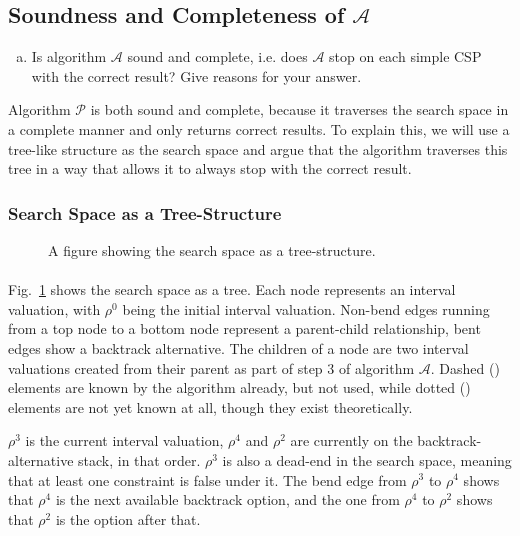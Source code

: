 \subsection{Soundness and Completeness of $\mathcal{A}$}
\begin{enumerate}[(b)]
\item Is algorithm $\mathcal{A}$ sound and complete, i.e. does $\mathcal{A}$ stop on each simple CSP with the correct result? Give reasons for your answer.
\end{enumerate}

Algorithm $\mathcal{P}$ is both sound and complete, because it traverses the search space in a complete manner and only returns correct results.
To explain this, we will use a tree-like structure as the search space and argue that the algorithm traverses this tree in a way that allows it to always stop with the correct result.

\subsubsection{Search Space as a Tree-Structure}

\begin{figure}[H]
    \centering
    
    \caption{
        A figure showing the search space as a tree-structure.
    }
    \label{fig:search-tree}
\end{figure}


\paragraph{}
Fig.~\ref{fig:search-tree} shows the search space as a tree.
Each node represents an interval valuation, with $\rho^0$ being the initial interval valuation.
Non-bend edges running from a top node to a bottom node represent a parent-child relationship, bent edges show a backtrack alternative.
The children of a node are two interval valuations created from their parent as part of step 3 of algorithm $\mathcal{A}$.
Dashed (\dashed) elements are known by the algorithm already, but not used, while dotted (\dotted) elements are not yet known at all, though they exist theoretically.

$\rho^3$ is the current interval valuation, $\rho^4$ and $\rho^2$ are currently on the backtrack-alternative stack, in that order.
$\rho^3$ is also a dead-end in the search space, meaning that at least one constraint is false under it.
The bend edge from $\rho^3$ to $\rho^4$ shows that $\rho^4$ is the next available backtrack option, and the one from $\rho^4$ to $\rho^2$ shows that $\rho^2$ is the option after that.

